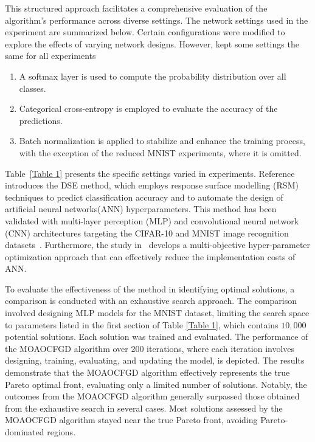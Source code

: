 \documentclass[smallextended,referee,envcountsect]{svjour3}
\begin{document}
This structured approach facilitates a comprehensive evaluation of the algorithm's performance across diverse settings. The network settings used in the experiment are summarized below. Certain configurations were modified to explore the effects of varying network designs.
However, kept some settings the same for all experiments
\begin{enumerate}
    \item {} A softmax layer is used to compute the probability distribution over all classes.
    \item {} Categorical cross-entropy is employed to evaluate the accuracy of the predictions.
    \item {} Batch normalization is applied to stabilize and enhance the training process, with the exception of the reduced MNIST experiments, where it is omitted.
\end{enumerate}
Table~\ref{Table 1} presents the specific settings varied in experiments. Reference~\cite{18} introduces the DSE method, which employs response surface modelling (RSM) techniques to predict classification accuracy and to automate the design of artificial neural networks(ANN) hyperparameters. This method has been validated with multi-layer perception (MLP) and convolutional neural network (CNN) architectures targeting the CIFAR-10 and MNIST image recognition datasets~\cite{33,34}. Furthermore, the study in~\cite{18} develops a multi-objective hyper-parameter optimization approach that can effectively reduce the implementation costs of ANN.


\par To evaluate the effectiveness of the method in identifying optimal solutions, a comparison is conducted with an exhaustive search approach. The comparison involved designing MLP models for the MNIST dataset, limiting the search space to parameters listed in the first section of Table \ref{Table 1}, which contains $10,000$ potential solutions. Each solution was trained and evaluated. The performance of the MOAOCFGD algorithm over 200 iterations, where each iteration involves designing, training, evaluating, and updating the model, is depicted. The results demonstrate that the MOAOCFGD algorithm effectively represents the true Pareto optimal front, evaluating only a limited number of solutions. Notably, the outcomes from the MOAOCFGD algorithm generally surpassed those obtained from the exhaustive search in several cases. Most solutions assessed by the MOAOCFGD algorithm stayed near the true Pareto front, avoiding Pareto-dominated regions.
\end{document}
